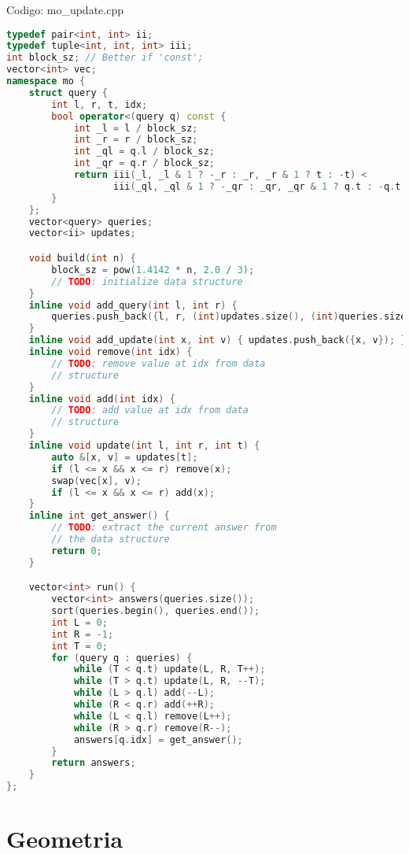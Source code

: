 \documentclass[10pt, a4paper, oneside]{book}
\begin{document}
\hfill

Codigo: mo\_update.cpp

\begin{lstlisting}[language=C++]
typedef pair<int, int> ii;
typedef tuple<int, int, int> iii;
int block_sz; // Better if 'const';
vector<int> vec;
namespace mo {
    struct query {
        int l, r, t, idx;
        bool operator<(query q) const {
            int _l = l / block_sz;
            int _r = r / block_sz;
            int _ql = q.l / block_sz;
            int _qr = q.r / block_sz;
            return iii(_l, _l & 1 ? -_r : _r, _r & 1 ? t : -t) <
                   iii(_ql, _ql & 1 ? -_qr : _qr, _qr & 1 ? q.t : -q.t);
        }
    };
    vector<query> queries;
    vector<ii> updates;

    void build(int n) {
        block_sz = pow(1.4142 * n, 2.0 / 3);
        // TODO: initialize data structure
    }
    inline void add_query(int l, int r) {
        queries.push_back({l, r, (int)updates.size(), (int)queries.size()});
    }
    inline void add_update(int x, int v) { updates.push_back({x, v}); }
    inline void remove(int idx) {
        // TODO: remove value at idx from data
        // structure
    }
    inline void add(int idx) {
        // TODO: add value at idx from data
        // structure
    }
    inline void update(int l, int r, int t) {
        auto &[x, v] = updates[t];
        if (l <= x && x <= r) remove(x);
        swap(vec[x], v);
        if (l <= x && x <= r) add(x);
    }
    inline int get_answer() {
        // TODO: extract the current answer from
        // the data structure
        return 0;
    }

    vector<int> run() {
        vector<int> answers(queries.size());
        sort(queries.begin(), queries.end());
        int L = 0;
        int R = -1;
        int T = 0;
        for (query q : queries) {
            while (T < q.t) update(L, R, T++);
            while (T > q.t) update(L, R, --T);
            while (L > q.l) add(--L);
            while (R < q.r) add(++R);
            while (L < q.l) remove(L++);
            while (R > q.r) remove(R--);
            answers[q.idx] = get_answer();
        }
        return answers;
    }
};
\end{lstlisting}
\hfill

\newpage

%
%
%
%

\chapter{Geometria}
\end{document}
